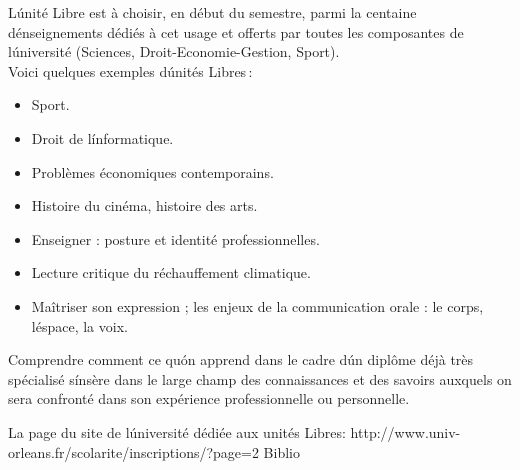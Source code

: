 {
L\'unité Libre est à choisir, en début du semestre, parmi la centaine d\'enseignements dédiés à cet usage et offerts par toutes
les composantes de l\'université (Sciences, Droit-Economie-Gestion, Sport).\\
Voici quelques exemples d\'unités Libres\,:
\begin{itemize}
  \item Sport.
  \item Droit de l\'informatique.
  \item Problèmes économiques contemporains.
  \item Histoire du cinéma, histoire des arts.
  \item Enseigner : posture et identité professionnelles.
  \item Lecture critique du réchauffement climatique.
  \item Maîtriser son expression ; les enjeux de la communication orale : le corps, l\'espace, la voix.
\end{itemize} 
} 
{}
{\begin{itemize}
 \ObjItem Comprendre comment ce qu\'on apprend dans le cadre d\'un diplôme déjà très spécialisé s\'insère dans le large champ des connaissances
 et des savoirs auxquels on sera confronté dans son expérience professionnelle ou personnelle.
\end{itemize} 
} 
{La page du site de l\'université dédiée aux unités Libres: http://www.univ-orleans.fr/scolarite/inscriptions/?page=2} 
{Biblio} 
 
\vfill

